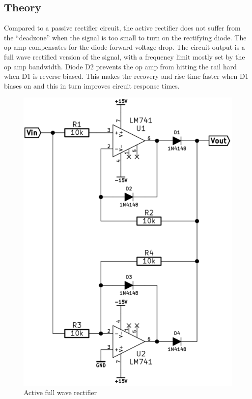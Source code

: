 \documentclass[11pt,a4paper]{article}
\begin{document}
\subsection{Theory}\label{fwr-theory}
Compared to a passive rectifier circuit, the active rectifier does not suffer
from the ``deadzone'' when the signal is too small to turn on the rectifying
diode. The op amp compensates for the diode forward voltage drop.  The circuit
output is a full wave rectified version of the signal, with a frequency limit
mostly set by the op amp bandwidth. Diode D2 prevents the op amp from hitting
the rail hard when D1 is reverse biased. This makes the recovery and rise time
faster when D1 biases on and this in turn improves circuit response times.

\begin{figure}[htbp]
    \centering
    \includegraphics[scale=0.5]{img/fwr.png}
    \caption{Active full wave rectifier}
    \label{fig:fwr-schem}
\end{figure}
\end{document}
